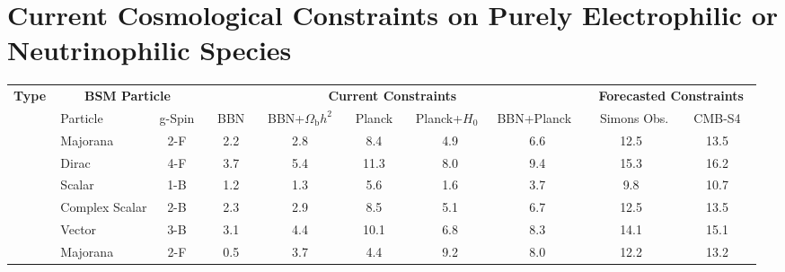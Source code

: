 \documentclass[notitlepage,letterpaper,natbib,aps,prd,onecolumn,amsmath,amsfonts,nofootinbib,preprintnumbers,superscriptaddress,secnumarabic,groupedaddress]{revtex4-1}
\begin{document}
\section{Current Cosmological Constraints on Purely Electrophilic or Neutrinophilic Species}\label{sec:results}
\vspace{-0.2cm}

\begin{table}[t]
\begin{center}
{\def\arraystretch{1.35}
\begin{tabular}{l|lc|ccccc|cc}
\hline\hline
\multirow{2}{*}{\textbf{Type}$\,$}	& \multicolumn{2}{c|}{\textbf{BSM Particle}}   	 &  \multicolumn{5}{c|}{$\,\, $ \textbf{Current Constraints} $\,\,$}  &  \multicolumn{2}{c}{$\,\, $ \textbf{Forecasted Constraints} $\, $} \\
   &	 \multirow{1}{*}{Particle}    	 &   \multirow{1}{*}{g-Spin}  &   
   \multicolumn{1}{c}{$\,\,\,$ BBN $\,\,\,$}  &
   \multicolumn{1}{c}{BBN+$\Omega_\mathrm{b} h^2$}  &
   \multicolumn{1}{c}{$\,\,\,$ Planck $\,\,\,$}  &
   \multicolumn{1}{c}{Planck+$H_0$ $\,$}  &   \multicolumn{1}{c|}{BBN+Planck$\,\,\,$} &   \multicolumn{1}{c}{$\,$ Simons Obs.}  &   \multicolumn{1}{c}{$\,$ CMB-S4 $\,$} \\ 
  \hline \hline
\parbox[t]{8mm}{}   

& Majorana   & 2-F  & 2.2 &  2.8  & 8.4 & 4.9 & 6.6  & 12.5   & 13.5  \\  

& Dirac  & 4-F  & 3.7 &  5.4  & 11.3 & 8.0 & 9.4  & 15.3  & 16.2    \\  

& Scalar   & 1-B  & 1.2 & 1.3  & 5.6 & 1.6 & 3.7  & 9.8  & 10.7\\  

& Complex Scalar  & 2-B  & 2.3 & 2.9  & 8.5 & 5.1 & 6.7  & 12.5  & 13.5\\  

& Vector  & 3-B  & 3.1 & 4.4  & 10.1 & 6.8 & 8.3  & 14.1  & 15.1   \\  
\hline	

  \parbox[t]{8mm}{}   

&Majorana & 2-F  &  0.5 & 3.7 & 4.4 & 9.2 & 8.0  & 12.2  & 13.2\\  


\end{tabular}}
\end{center}
\end{table}
\end{document}
